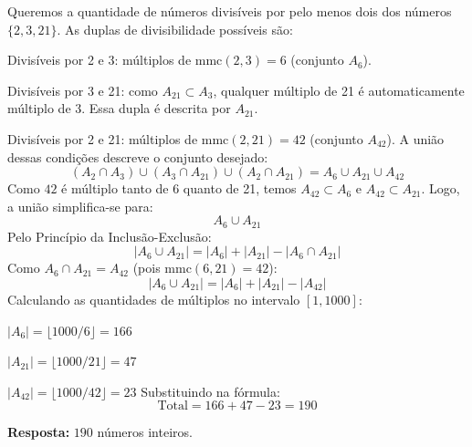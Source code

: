 \documentclass[a4paper,10pt,landscape,twocolumn]{article}  %
\let\oldenumerate\enumerate
\let\oldendenumerate\endenumerate
\renewenvironment{enumerate}{%
  \oldenumerate%
  \setlength{\itemsep}{1pt}%
  \setlength{\parskip}{0pt}%
  \setlength{\parsep}{0pt}%
  \setlength{\topsep}{2pt}%
  \setlength{\partopsep}{0pt}%
}{%
  \oldendenumerate%
}
\let\olditemize\itemize
\let\oldenditemize\enditemize
\renewenvironment{itemize}{%
  \olditemize%
  \setlength{\itemsep}{1pt}%
  \setlength{\parskip}{0pt}%
  \setlength{\parsep}{0pt}%
  \setlength{\topsep}{2pt}%
  \setlength{\partopsep}{0pt}%
}{%
  \oldenditemize%
}
\begin{document}
\begin{enumerate}
    Queremos a quantidade de números divisíveis por pelo menos dois dos números $\{2, 3, 21\}$. As duplas de divisibilidade possíveis são:
    \begin{enumerate}
        \item Divisíveis por 2 e 3: múltiplos de $\text{mmc}(2, 3) = 6$ (conjunto $A_6$).
        \item Divisíveis por 3 e 21: como $A_{21} \subset A_3$, qualquer múltiplo de 21 é automaticamente múltiplo de 3. Essa dupla é descrita por $A_{21}$.
        \item Divisíveis por 2 e 21: múltiplos de $\text{mmc}(2, 21) = 42$ (conjunto $A_{42}$).
    \end{enumerate}
    A união dessas condições descreve o conjunto desejado:
    \[ (A_2 \cap A_3) \cup (A_3 \cap A_{21}) \cup (A_2 \cap A_{21}) = A_6 \cup A_{21} \cup A_{42} \]
    Como $42$ é múltiplo tanto de 6 quanto de 21, temos $A_{42} \subset A_6$ e $A_{42} \subset A_{21}$. Logo, a união simplifica-se para:
    \[ A_6 \cup A_{21} \]
    Pelo Princípio da Inclusão-Exclusão:
    \[ |A_6 \cup A_{21}| = |A_6| + |A_{21}| - |A_6 \cap A_{21}| \]
    Como $A_6 \cap A_{21} = A_{42}$ (pois $\text{mmc}(6, 21) = 42$):
    \[ |A_6 \cup A_{21}| = |A_6| + |A_{21}| - |A_{42}| \]
    Calculando as quantidades de múltiplos no intervalo $[1, 1000]$:
    \begin{itemize}
        \item $|A_6| = \lfloor 1000 / 6 \rfloor = 166$
        \item $|A_{21}| = \lfloor 1000 / 21 \rfloor = 47$
        \item $|A_{42}| = \lfloor 1000 / 42 \rfloor = 23$
    \end{itemize}
    Substituindo na fórmula:
    \[ \text{Total} = 166 + 47 - 23 = 190 \]
    
    \textbf{Resposta:} $190$ números inteiros.

\end{enumerate}
\end{document}
